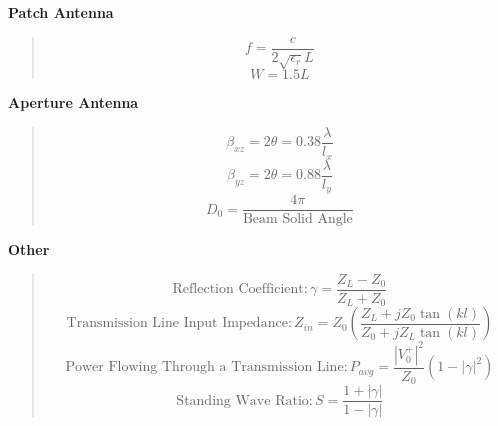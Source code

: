\documentclass{article} %
\begin{document}
\textbf{Patch Antenna}
\begin{quote}
    \[f = \frac{c}{2\sqrt{\epsilon_r}L}\]
    \[W = 1.5 L\]
\end{quote}

\textbf{Aperture Antenna}
\begin{quote}
    \[\beta_{xz} = 2 \theta = 0.38 \frac{\lambda}{l_x}\]
    \[\beta_{yz} = 2 \theta = 0.88 \frac{\lambda}{l_y}\]
    \[D_0 = \frac{4 \pi}{\text{Beam Solid Angle}}\]
\end{quote}

\textbf{Other}
\begin{quote}
    \[\text{Reflection Coefficient}: \gamma = \frac{Z_L - Z_0}{Z_L + Z_0}\]
    \[\text{Transmission Line Input Impedance}: Z_{in} = Z_0\left(\frac{Z_L + jZ_0 \tan(kl)}{Z_0 + jZ_L\tan(kl)}\right)\]
    \[\text{Power Flowing Through a Transmission Line}: P_{avg} = \frac{|V_0 ^+|^2}{Z_0} (1 - |\gamma|^2)\]
    \[\text{Standing Wave Ratio}: S = \frac{1 + |\gamma|}{1 - |\gamma|}\]
\end{quote}
\end{document}
